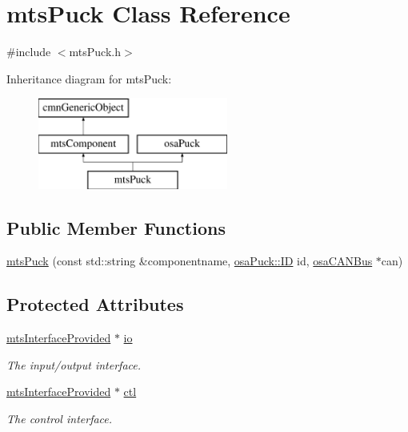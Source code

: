 \hypertarget{classmts_puck}{\section{mts\-Puck Class Reference}
\label{classmts_puck}
}


{\ttfamily \#include $<$mts\-Puck.\-h$>$}

Inheritance diagram for mts\-Puck\-:\begin{figure}[H]
\begin{center}
\leavevmode
\includegraphics[height=3.000000cm]{de/dae/classmts_puck}
\end{center}
\end{figure}
\subsection*{Public Member Functions}
\begin{DoxyCompactItemize}
\item 
\hyperlink{classmts_puck_a2b90fcc8e3d4f0d7559e90f51fcd1234}{mts\-Puck} (const std\-::string \&componentname, \hyperlink{classosa_puck_aa484456bae759574accdc76fe68b4685}{osa\-Puck\-::\-I\-D} id, \hyperlink{classosa_c_a_n_bus}{osa\-C\-A\-N\-Bus} $\ast$can)
\end{DoxyCompactItemize}
\subsection*{Protected Attributes}
\begin{DoxyCompactItemize}
\item 
\hyperlink{classmts_interface_provided}{mts\-Interface\-Provided} $\ast$ \hyperlink{classmts_puck_adea7df2434dcfa2dc1c56fd2e4d2d633}{io}
\begin{DoxyCompactList}\small\item\em The input/output interface. \end{DoxyCompactList}\item 
\hyperlink{classmts_interface_provided}{mts\-Interface\-Provided} $\ast$ \hyperlink{classmts_puck_a65fcf71bc74ff8496c5c170b0b4cf1aa}{ctl}
\begin{DoxyCompactList}\small\item\em The control interface. \end{DoxyCompactList}\end{DoxyCompactItemize}
